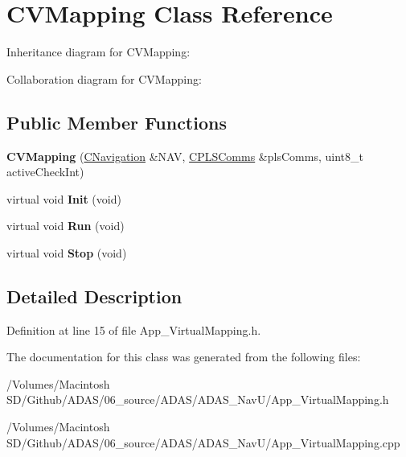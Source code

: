 \hypertarget{class_c_v_mapping}{}\section{C\+V\+Mapping Class Reference}
\label{class_c_v_mapping}


Inheritance diagram for C\+V\+Mapping\+:


Collaboration diagram for C\+V\+Mapping\+:
\subsection*{Public Member Functions}
\begin{DoxyCompactItemize}
\item 
\mbox{\label{class_c_v_mapping_af86c4ccdcc090b0dc4a294f419d3c70f}} 
{\bfseries C\+V\+Mapping} (\mbox{\hyperlink{class_c_navigation}{C\+Navigation}} \&N\+AV, \mbox{\hyperlink{class_c_p_l_s_comms}{C\+P\+L\+S\+Comms}} \&pls\+Comms, uint8\+\_\+t active\+Check\+Int)
\item 
\mbox{\label{class_c_v_mapping_a110257122b8946bcb8f17051070e03eb}} 
virtual void {\bfseries Init} (void)
\item 
\mbox{\label{class_c_v_mapping_a8f064fcfd01953d7072efd5de23f89ef}} 
virtual void {\bfseries Run} (void)
\item 
\mbox{\label{class_c_v_mapping_ad4e34f79b444109d0cbf1223881126dc}} 
virtual void {\bfseries Stop} (void)
\end{DoxyCompactItemize}


\subsection{Detailed Description}


Definition at line 15 of file App\+\_\+\+Virtual\+Mapping.\+h.



The documentation for this class was generated from the following files\+:\begin{DoxyCompactItemize}
\item 
/\+Volumes/\+Macintosh S\+D/\+Github/\+A\+D\+A\+S/06\+\_\+source/\+A\+D\+A\+S/\+A\+D\+A\+S\+\_\+\+Nav\+U/App\+\_\+\+Virtual\+Mapping.\+h\item 
/\+Volumes/\+Macintosh S\+D/\+Github/\+A\+D\+A\+S/06\+\_\+source/\+A\+D\+A\+S/\+A\+D\+A\+S\+\_\+\+Nav\+U/App\+\_\+\+Virtual\+Mapping.\+cpp\end{DoxyCompactItemize}
